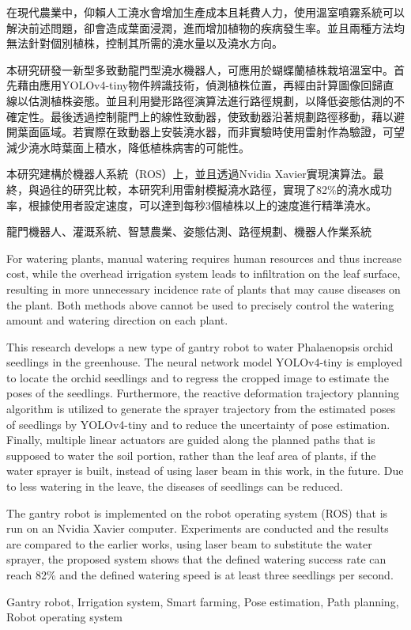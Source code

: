 \begin{abstractzh}
\setcounter{page}{1}

在現代農業中，仰賴人工澆水會增加生產成本且耗費人力，使用溫室噴霧系統可以解決前述問題，卻會造成葉面浸潤，進而增加植物的疾病發生率。並且兩種方法均無法針對個別植株，控制其所需的澆水量以及澆水方向。

本研究研發一新型多致動龍門型澆水機器人，可應用於蝴蝶蘭植株栽培溫室中。首先藉由應用YOLOv4-tiny物件辨識技術，偵測植株位置，再經由計算圖像回歸直線以估測植株姿態。並且利用變形路徑演算法進行路徑規劃，以降低姿態估測的不確定性。最後透過控制龍門上的線性致動器，使致動器沿著規劃路徑移動，藉以避開葉面區域。若實際在致動器上安裝澆水器，而非實驗時使用雷射作為驗證，可望減少澆水時葉面上積水，降低植株病害的可能性。


本研究建構於機器人系統（ROS）上，並且透過Nvidia Xavier實現演算法。最終，與過往的研究比較，本研究利用雷射模擬澆水路徑，實現了82\%的澆水成功率，根據使用者設定速度，可以達到每秒3個植株以上的速度進行精準澆水。


\Keywordszh 龍門機器人、灌溉系統、智慧農業、姿態估測、路徑規劃、機器人作業系統

\end{abstractzh}


\begin{abstracten}

For watering plants, manual watering requires human resources and thus increase cost, while the overhead irrigation system leads to infiltration on the leaf surface, resulting in more unnecessary incidence rate of plants that may cause diseases on the plant. Both methods above cannot be used to precisely control the watering amount and watering direction on each plant.

This research develops a new type of gantry robot to water Phalaenopsis orchid seedlings in the greenhouse. The neural network model YOLOv4-tiny is employed to locate the orchid seedlings and to regress the cropped image to estimate the poses of the seedlings. Furthermore, the reactive deformation trajectory planning algorithm is utilized to generate the sprayer trajectory from the estimated poses of seedlings by YOLOv4-tiny and to reduce the uncertainty of pose estimation. Finally, multiple linear actuators are guided along the planned paths that is supposed to water the soil portion, rather than the leaf area of plants, if the water sprayer is built, instead of using laser beam in this work, in the future. Due to less watering in the leave, the diseases of seedlings can be reduced.

The gantry robot is implemented on the robot operating system (ROS) that is run on an Nvidia Xavier computer. Experiments are conducted and the results are compared to the earlier works, using laser beam to substitute the water sprayer, the proposed system shows that the defined watering success rate can reach 82\% and the defined watering speed is at least three seedlings per second. 

\Keywordsen Gantry robot, Irrigation system, Smart farming, Pose estimation, Path planning, Robot operating system

\end{abstracten}

